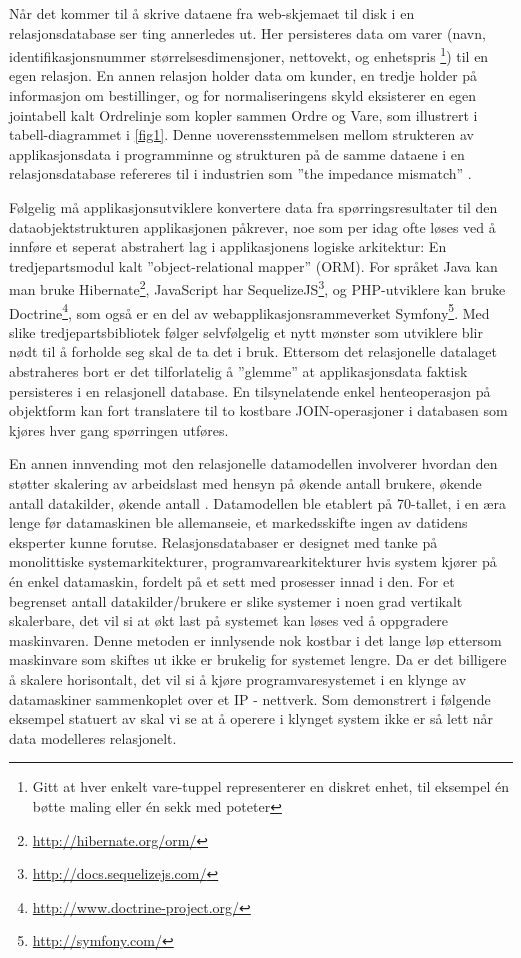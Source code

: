 Når det kommer til å skrive dataene fra web-skjemaet til disk i en relasjonsdatabase ser ting annerledes ut. Her persisteres data om varer (navn, identifikasjonsnummer størrelsesdimensjoner, nettovekt, og enhetspris \footnote{Gitt at hver enkelt vare-tuppel representerer en diskret enhet, til eksempel én bøtte maling eller én sekk med poteter}) til en egen relasjon. En annen relasjon holder data om kunder, en tredje holder på informasjon om bestillinger, og for normaliseringens skyld eksisterer en egen jointabell kalt Ordrelinje som kopler sammen Ordre og Vare, som illustrert i tabell-diagrammet i \ref{fig1}. Denne uoverensstemmelsen mellom strukteren av applikasjonsdata i programminne og strukturen på de samme dataene i en relasjonsdatabase refereres til i industrien som ''the impedance mismatch'' \citep{sadalage2013}.

Følgelig må applikasjonsutviklere konvertere data fra spørringsresultater til den dataobjektstrukturen applikasjonen påkrever, noe som per idag ofte løses ved å innføre et seperat abstrahert lag i applikasjonens logiske arkitektur: En tredjepartsmodul kalt ''object-relational mapper'' (ORM). For språket Java kan man bruke Hibernate\footnote{\url{http://hibernate.org/orm/}}, JavaScript har SequelizeJS\footnote{\url{http://docs.sequelizejs.com/}}, og PHP-utviklere kan bruke Doctrine\footnote{\url{http://www.doctrine-project.org/}}, som også er en del av webapplikasjonsrammeverket Symfony\footnote{\url{http://symfony.com/}}. Med slike tredjepartsbibliotek følger selvfølgelig et nytt mønster som utviklere blir nødt til å forholde seg skal de ta det i bruk. Ettersom det relasjonelle datalaget abstraheres bort er det tilforlatelig å ''glemme'' at applikasjonsdata faktisk persisteres i en relasjonell database. En tilsynelatende enkel henteoperasjon på objektform kan fort translatere til to kostbare JOIN-operasjoner i databasen som kjøres hver gang spørringen utføres.

En annen innvending mot den relasjonelle datamodellen involverer hvordan den støtter skalering av arbeidslast med hensyn på økende antall brukere, økende antall datakilder, økende antall . Datamodellen ble etablert på 70-tallet, i en æra lenge før datamaskinen ble allemanseie, et markedsskifte ingen av datidens eksperter kunne forutse. Relasjonsdatabaser er designet med tanke på monolittiske systemarkitekturer, programvarearkitekturer hvis system kjører på én enkel datamaskin, fordelt på et sett med prosesser innad i den. For et begrenset antall datakilder/brukere er slike systemer i noen grad vertikalt skalerbare, det vil si at økt last på systemet kan løses ved å oppgradere maskinvaren. Denne metoden er innlysende nok kostbar i det lange løp ettersom maskinvare som skiftes ut ikke er brukelig for systemet lengre. Da er det billigere å skalere horisontalt, det vil si å kjøre programvaresystemet i en klynge av datamaskiner sammenkoplet over et IP - nettverk. Som demonstrert i følgende eksempel statuert av \cite{george2011} skal vi se at å operere i klynget system ikke er så lett når data modelleres relasjonelt.

